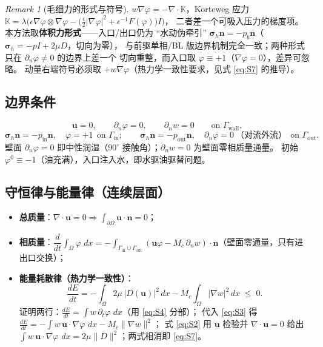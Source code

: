 \documentclass[11pt]{article}
\theoremstyle{definition}
\theoremstyle{plain}
\theoremstyle{remark}
\newtheorem{remarkx}[assumption]{Remark}
\newcommand{\vel}{\bm{u}}
\newcommand{\normal}{\bm{n}}
\newcommand{\stress}{\bm{\sigma}}
\newcommand{\dd}{\,dx}
\begin{document}
\begin{remarkx}[毛细力的形式与符号]\label{rem:korteweg}
$w\nabla\varphi=-\nabla\cdot\mathbb K$，Korteweg 应力
$\mathbb K=\lambda\big(\epsilon\nabla\varphi\otimes\nabla\varphi
-\big(\tfrac{\epsilon}{2}|\nabla\varphi|^2+\epsilon^{-1}F(\varphi)\big)I\big)$，
二者差一个可吸入压力的梯度项。本方法取\textbf{体积力形式}——入口/出口仍为
``水动伪牵引'' $\stress_h\normal=-p_b\normal$（$\stress_h=-pI+2\mu D$，切向为零），
与前驱单相/BL 版边界机制完全一致；两种形式只在 $\partial_n\varphi\neq0$ 的边界上差一个
切向重整，而入口取 $\varphi\equiv+1$（$\nabla\varphi=0$），差异可忽略。
动量右端符号必须取 $+w\nabla\varphi$（热力学一致性要求，见式 \eqref{eq:S7} 的推导）。
\end{remarkx}

\subsection{边界条件}
\begin{equation}
\vel=0,\qquad \partial_n\varphi=0,\qquad \partial_n w=0
\qquad \text{on }\Gamma_{\mathrm{wall}},
\tag{S5}\label{eq:S5}
\end{equation}
\begin{equation}
\stress_h\normal=-p_{\mathrm{in}}\normal,\quad \varphi=+1 \ \ \text{on }\Gamma_{\mathrm{in}};
\qquad
\stress_h\normal=-p_{\mathrm{out}}\normal,\quad \partial_n\varphi=0\ \text{（对流外流）}\ \ \text{on }\Gamma_{\mathrm{out}}.
\tag{S6}\label{eq:S6}
\end{equation}
壁面 $\partial_n\varphi=0$ 即中性润湿（$90^\circ$ 接触角）；$\partial_n w=0$ 为壁面零相质量通量。
初始 $\varphi^0\equiv-1$（油充满），入口注入水，即水驱油驱替问题。

\subsection{守恒律与能量律（连续层面）}
\begin{itemize}
\item \textbf{总质量}：$\nabla\cdot\vel=0\Rightarrow\int_{\partial\Omega}\vel\cdot\normal=0$；
\item \textbf{相质量}：$\dfrac{d}{dt}\int_\Omega\varphi\,\dd
=-\int_{\Gamma_{\mathrm{in}}\cup\Gamma_{\mathrm{out}}}
(\vel\varphi-M_c\,\partial_n w)\cdot\normal$（壁面零通量，只有进出口交换）；
\item \textbf{能量耗散律（热力学一致性）}：
\begin{equation}
\frac{dE}{dt}=-\int_\Omega 2\mu\,|D(\vel)|^2\dd
-M_c\int_\Omega|\nabla w|^2\dd\;\le\;0.
\tag{S7}\label{eq:S7}
\end{equation}
证明两行：$\tfrac{dE}{dt}=\int w\,\partial_t\varphi\,\dd$（用 \eqref{eq:S4} 分部）；
代入 \eqref{eq:S3} 得 $\tfrac{dE}{dt}=-\int w\,\vel\cdot\nabla\varphi\,\dd-M_c\|\nabla w\|^2$；
式 \eqref{eq:S2} 用 $\vel$ 检验并 $\nabla\cdot\vel=0$ 给出
$\int w\,\vel\cdot\nabla\varphi\,\dd=2\mu\|D\|^2$；两式相消即 \eqref{eq:S7}。
\end{itemize}
\end{document}
